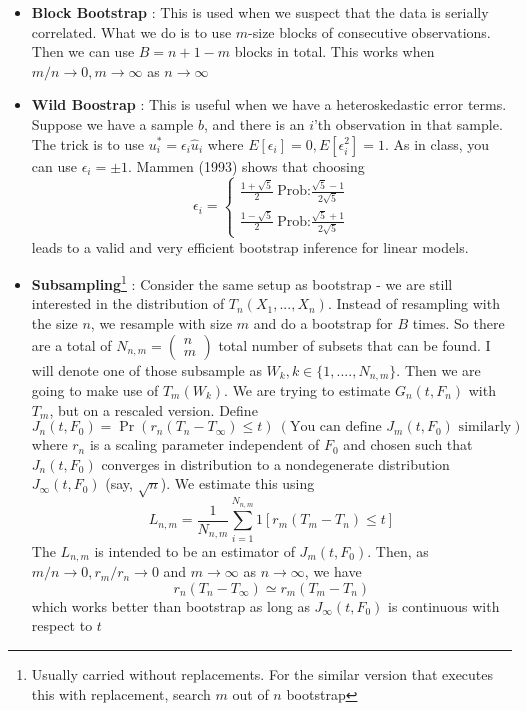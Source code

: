 \begin{itemize}
\item \textbf{Block Bootstrap} : This is used when we suspect that the data is serially correlated. What we do is to use $m$-size blocks of consecutive observations. Then we can use $B=n+1-m$ blocks in total. This works when $m/n\to0, m\to\infty$ as $n\to\infty$
\item \textbf{Wild Boostrap} : This is useful when we have a heteroskedastic error terms. Suppose we have a sample $b$, and there is an $i$'th observation in that sample. The trick is to use $u_i^*= \epsilon_i\hat{u}_i$ where $E[\epsilon_i]=0, E[\epsilon_i^2]=1$. As in class, you can use $\epsilon_i = \pm 1$. Mammen (1993) shows that choosing 
\[
\epsilon_i = \begin{cases} \frac{1+\sqrt{5}}{2} \ \text{Prob:} \frac{\sqrt{5}-1}{2\sqrt{5}} \\ \frac{1-\sqrt{5}}{2} \ \text{Prob:} \frac{\sqrt{5}+1}{2\sqrt{5}}\end{cases}
\]
leads to a valid and very efficient bootstrap inference for linear models. 
\item \textbf{Subsampling}\footnote{Usually carried without replacements. For the similar version that executes this with replacement, search $m$ out of $n$ bootstrap} : Consider the same setup as bootstrap - we are still interested in the distribution of $T_n(X_1,...,X_n)$. Instead of resampling with the size $n$, we resample with size $m$ and do a bootstrap for $B$ times. So there are a total of $N_{n,m}=\begin{pmatrix} n \\ m \end{pmatrix}$ total number of subsets that can be found. I will denote one of those subsample as $W_k, k\in\{1,....,N_{n,m}\}$. Then we are going to make use of $T_m(W_k)$. We are trying to estimate $G_n(t, F_n)$ with $T_m$, but on a rescaled version. Define
\[
J_n(t,F_0)=\Pr(r_n(T_n-T_\infty)\leq t) \ (\text{You can define $J_m(t,F_0)$ similarly})
\]
where $r_n$ is a scaling parameter independent of $F_0$ and chosen such that $J_n(t,F_0)$ converges in distribution to a nondegenerate distribution $J_\infty (t,F_0)$ (say, $\sqrt{n}$). We estimate this using
\[
L_{n,m}=\frac{1}{N_{n,m}}\sum_{i=1}^{N_{n,m}}1[r_m(T_m-T_n)\leq t]
\]
The $L_{n,m}$ is intended to be an estimator of $J_m(t,F_0)$. Then, as $m/n\to0, r_m/r_n\to0$ and $m\to\infty$ as $n\to\infty$, we have 
\[
r_n(T_n-T_\infty) \simeq r_m(T_m-T_n)
\]
which works better than bootstrap as long as $J_\infty (t,F_0)$ is continuous with respect to $t$
\end{itemize}

